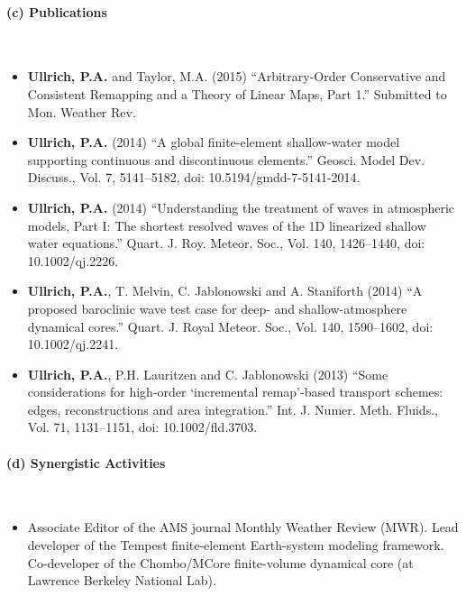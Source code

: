 \documentclass[11pt]{article}
\begin{document}
\vspace{-0.3cm}
\paragraph{\large (c) Publications}\ \\
\vspace{-0.8cm}
\begin{itemize}
\item \textbf{Ullrich, P.A.} and Taylor, M.A. (2015) ``Arbitrary-Order Conservative and Consistent Remapping and a Theory of Linear Maps, Part 1.''  Submitted to Mon. Weather Rev.

\item \textbf{Ullrich, P.A.} (2014) ``A global finite-element shallow-water model supporting continuous and discontinuous elements.''  Geosci. Model Dev. Discuss., Vol. 7, 5141--5182, doi: 10.5194/gmdd-7-5141-2014.

\item \textbf{Ullrich, P.A.} (2014) ``Understanding the treatment of waves in atmospheric models, Part I: The shortest resolved waves of the 1D linearized shallow water equations.'' Quart. J. Roy. Meteor. Soc., Vol. 140, 1426--1440, doi: 10.1002/qj.2226. 

\item \textbf{Ullrich, P.A.}, T. Melvin, C. Jablonowski and A. Staniforth (2014) {``A proposed baroclinic wave test case for deep- and shallow-atmosphere dynamical cores.''}  Quart. J. Royal Meteor. Soc., Vol. 140, 1590--1602, doi: 10.1002/qj.2241. 

\item \textbf{Ullrich, P.A.}, P.H. Lauritzen and C. Jablonowski (2013) {``Some considerations for high-order `incremental remap'-based transport schemes: edges, reconstructions and area integration.''}  Int. J. Numer. Meth. Fluids., Vol. 71, 1131--1151, doi: 10.1002/fld.3703.
\end{itemize}

\vspace{-0.5cm}
\paragraph{\large (d) Synergistic Activities}\ \\
\vspace{-0.8cm}
\begin{itemize}
\item Associate Editor of the AMS journal Monthly Weather Review (MWR).  Lead developer of the Tempest finite-element Earth-system modeling framework.  Co-developer of the Chombo/MCore finite-volume dynamical core (at Lawrence Berkeley National Lab).
\end{itemize}
\end{document}
